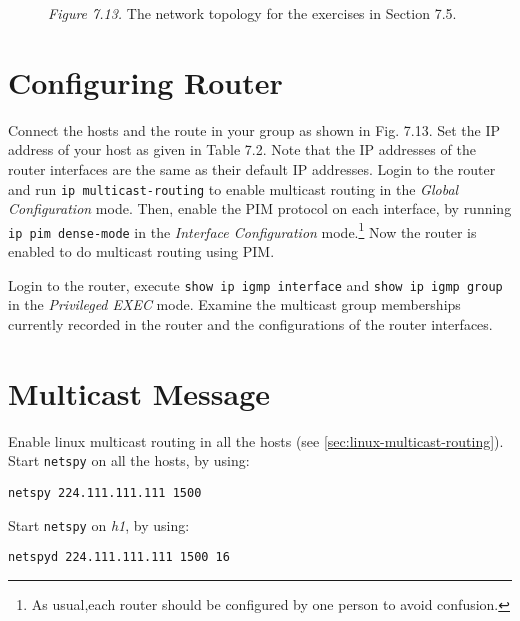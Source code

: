 \documentclass{../UTNetLab}
\begin{document}
    \begin{figure}[H]
        \centering
        \caption{\textit{Figure 7.13.} The network topology for the exercises in Section 7.5.}
        \label{fig:7.13}
    \end{figure}

\section{Configuring Router}
\label{sec:config-router}
    Connect the hosts and the route in your group as shown in Fig. 7.13. Set the IP address of your host as given in Table 7.2. Note that the IP addresses of the router interfaces are the same as their default IP addresses.
    Login to the router and run \lstinline{ip multicast-routing} to enable multicast routing in the \textit{Global Configuration} mode.
    Then, enable the PIM protocol on each interface, by running \lstinline{ip pim dense-mode} in the \textit{Interface Configuration} mode.\footnote{As usual,each router should be configured by one person to avoid confusion.} Now the router is enabled to do multicast routing using PIM.

    Login to the router, execute \lstinline{show ip igmp interface} and \lstinline{show ip igmp group} in the \textit{Privileged EXEC} mode.
    Examine the multicast group memberships currently recorded in the router and the configurations of the router interfaces.

\section{Multicast Message}
    Enable linux multicast routing in all the hosts (see \autoref{sec:linux-multicast-routing}).\\
    Start \lstinline{netspy} on all the hosts, by using:
    \begin{lstlisting}
netspy 224.111.111.111 1500
    \end{lstlisting}
    Start \lstinline{netspy} on \textit{h1}, by using:
    \begin{lstlisting}
netspyd 224.111.111.111 1500 16
    \end{lstlisting}
    
\end{document}
